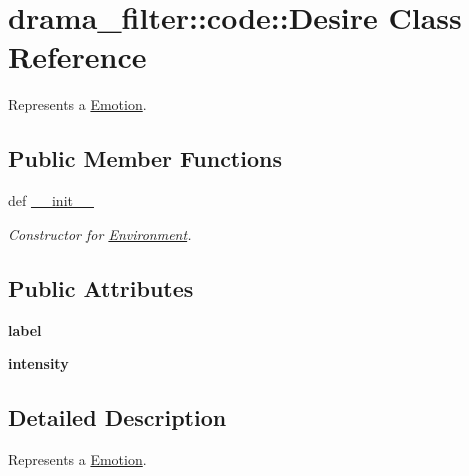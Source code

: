 \hypertarget{classdrama__filter_1_1code_1_1Desire}{
\section{drama\_\-filter::code::Desire Class Reference}
\label{classdrama__filter_1_1code_1_1Desire}
}


Represents a \hyperlink{classdrama__filter_1_1code_1_1Emotion}{Emotion}.  


\subsection*{Public Member Functions}
\begin{DoxyCompactItemize}
\item 
def \hyperlink{classdrama__filter_1_1code_1_1Desire_a39ff1309643d68f981a3e0e2ccdb906a}{\_\-\_\-init\_\-\_\-}
\begin{DoxyCompactList}\small\item\em Constructor for \hyperlink{classdrama__filter_1_1code_1_1Environment}{Environment}. \end{DoxyCompactList}\end{DoxyCompactItemize}
\subsection*{Public Attributes}
\begin{DoxyCompactItemize}
\item 
\hypertarget{classdrama__filter_1_1code_1_1Desire_aa8d6e84c7b8f7ae435bf9b971b643c9c}{
{\bfseries label}}
\label{classdrama__filter_1_1code_1_1Desire_aa8d6e84c7b8f7ae435bf9b971b643c9c}

\item 
\hypertarget{classdrama__filter_1_1code_1_1Desire_a39f66a6efebc38c40b3f8d542ff58364}{
{\bfseries intensity}}
\label{classdrama__filter_1_1code_1_1Desire_a39f66a6efebc38c40b3f8d542ff58364}

\end{DoxyCompactItemize}


\subsection{Detailed Description}
Represents a \hyperlink{classdrama__filter_1_1code_1_1Emotion}{Emotion}. 

